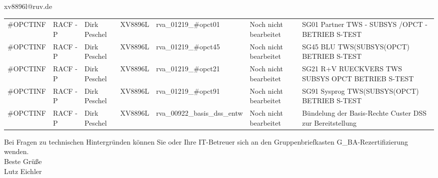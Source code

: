 \documentclass[a4paper,landscape,12pt]{letter}
\begin{document}
\begin{letter}{xv8896l@ruv.de\hfill \break}
\begin{tiny}
\begin{longtable}{|p{35mm}|p{15mm}|p{25mm}|p{10mm}|p{40mm}|p{50mm}|p{50mm}|}
\#OPCTINF & RACF - P & Dirk Peschel & XV8896L & rva\_01219\_\#opct01 & Noch nicht bearbeitet & SG01 Partner TWS - SUBSYS /OPCT - BETRIEB S-TEST \\
\#OPCTINF & RACF - P & Dirk Peschel & XV8896L & rva\_01219\_\#opct45 & Noch nicht bearbeitet & SG45 BLU TWS(SUBSYS(OPCT) BETRIEB S-TEST \\
\#OPCTINF & RACF - P & Dirk Peschel & XV8896L & rva\_01219\_\#opct21 & Noch nicht bearbeitet & SG21 R+V RUECKVERS TWS SUBSYS OPCT BETRIEB S-TEST \\
\#OPCTINF & RACF - P & Dirk Peschel & XV8896L & rva\_01219\_\#opct91 & Noch nicht bearbeitet & SG91 Sysprog TWS(SUBSYS(OPCT) BETRIEB S-TEST \\
\#OPCTINF & RACF - P & Dirk Peschel & XV8896L & rva\_00922\_basis\_dss\_entw & Noch nicht bearbeitet & Bündelung der Basis-Rechte Custer DSS zur Bereitstellung \\

\hline
		\end{longtable}
		\end{tiny}
	
\begin{minipage}{\textwidth}
			Bei Fragen zu technischen Hintergründen können Sie 
			oder Ihre IT-Betreuer sich an den Gruppenbriefkasten 
			G\_BA-Rezertifizierung
			wenden.\\
			\linebreak
			Beste Grüße\\
			Lutz Eichler
	\end{minipage}
	\end{letter}
	
\end{document}
